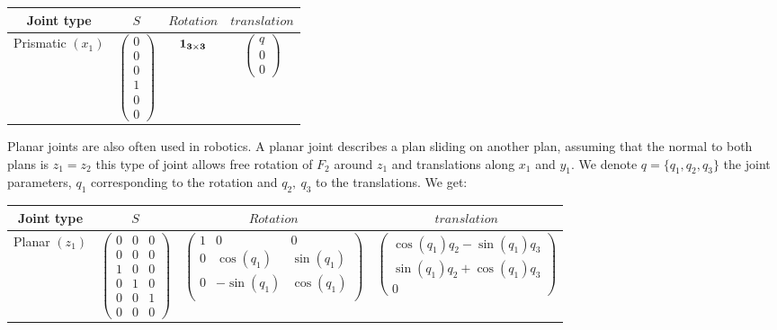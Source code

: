 \begin{tabular}{|c|c|c|c|}
  \hline
  Joint type & $S$ & $Rotation$ & $translation$ \\
  \hline
  Prismatic $(x_1)$
  &
  $\begin{pmatrix}
    0 \\ 0 \\ 0 \\ 1 \\ 0 \\ 0
  \end{pmatrix}$
  &
  $\bf{1}_{3\times3} $
  &
  $\begin{pmatrix}
    q \\ 0 \\ 0
  \end{pmatrix}$
  \\
  \hline
\end{tabular}

Planar joints are also often used in robotics. A planar joint describes a plan sliding on another plan, assuming that the normal to both plans is $z_1 = z_2$ this type of joint allows free rotation of $F_2$ around $z_1$ and translations along $x_1$ and $y_1$. We denote $q = \{q_1, q_2, q_3\}$ the joint parameters, $q_1$ corresponding to the rotation and $q_2,\ q_3$ to the translations. We get:

\begin{tabular}{|c|c|c|c|}
  \hline
  Joint type & $S$ & $Rotation$ & $translation$ \\
  \hline
  Planar $(z_1)$
  &
  $\begin{pmatrix}
    0 & 0 & 0 \\ 0 & 0 & 0 \\ 1 & 0 & 0 \\ 0 & 1 & 0 \\ 0 & 0 & 1 \\ 0 & 0 & 0
  \end{pmatrix}$
  &
  $\begin{pmatrix}
    1 & 0 & 0 \\
    0 & \cos(q_1) & \sin(q_1) \\
    0 & -\sin(q_1) & \cos(q_1) \\
  \end{pmatrix}$
  &
  $\begin{pmatrix}
    \cos(q_1)q_2 - \sin(q_1)q_3 \\ \sin(q_1)q_2 + \cos(q_1)q_3 \\ 0
  \end{pmatrix}$
  \\
  \hline
\end{tabular}


